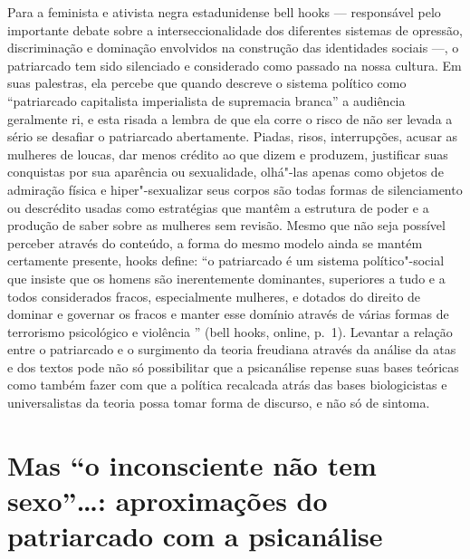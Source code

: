 Para a feminista e ativista negra estadunidense bell hooks --- responsável
pelo importante debate sobre a interseccionalidade dos diferentes
sistemas de opressão, discriminação e dominação envolvidos na construção
das identidades sociais ---, o patriarcado tem sido silenciado e
considerado como passado na nossa cultura. Em suas palestras, ela
percebe que quando descreve o sistema político como ``patriarcado
capitalista imperialista de supremacia branca'' a audiência geralmente
ri, e esta risada a lembra de que ela corre o risco de não ser levada a
sério se desafiar o patriarcado abertamente. Piadas, risos,
interrupções, acusar as mulheres de loucas, dar menos crédito ao que
dizem e produzem, justificar suas conquistas por sua aparência ou
sexualidade, olhá"-las apenas como objetos de admiração física e
hiper"-sexualizar seus corpos são todas formas de silenciamento ou
descrédito usadas como estratégias que mantêm a estrutura de poder e a
produção de saber sobre as mulheres sem revisão. Mesmo que não seja
possível perceber através do conteúdo, a forma do mesmo modelo ainda se
mantém certamente presente, hooks define: ``o patriarcado é um sistema
político"-social que insiste que os homens são inerentemente dominantes,
superiores a tudo e a todos considerados fracos, especialmente mulheres,
e dotados do direito de dominar e governar os fracos e manter esse
domínio através de várias formas de terrorismo psicológico e violência
'' (bell hooks, online, p.~1). Levantar a relação entre o patriarcado e o
surgimento da teoria freudiana através da análise da atas e dos textos
pode não só possibilitar que a psicanálise repense suas bases teóricas
como também fazer com que a política recalcada atrás das bases
biologicistas e universalistas da teoria possa tomar forma de discurso,
e não só de sintoma.

\section{Mas ``o inconsciente não tem sexo''\ldots{}: aproximações do
patriarcado com a psicanálise }

